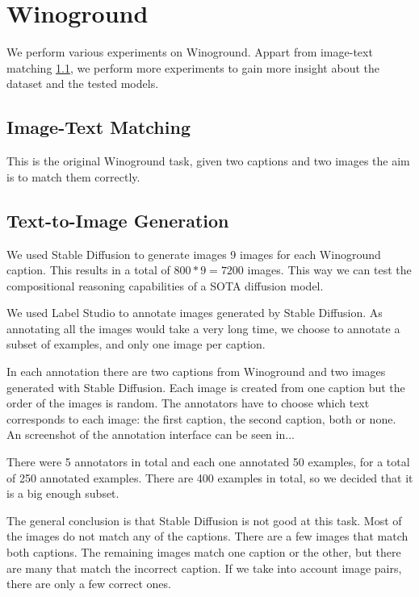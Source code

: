 \section{Winoground}

We perform various experiments on Winoground. Appart from image-text matching \ref{image_text_matching}, we perform more experiments to gain more insight about the dataset and the tested models.

\subsection{Image-Text Matching} \label{image_text_matching}

This is the original Winoground task, given two captions and two images the aim is to match them correctly.

\subsection{Text-to-Image Generation} \label{text_to_image_generation}

We used Stable Diffusion to generate images 9 images for each Winoground caption. This results in a total of $800*9=7200$ images. This way we can test the compositional reasoning capabilities of a SOTA diffusion model.

We used Label Studio to annotate images generated by Stable Diffusion. As annotating all the images would take a very long time, we choose to annotate a subset of examples, and only one image per caption.

In each annotation there are two captions from Winoground and two images generated with Stable Diffusion. Each image is created from one caption but the order of the images is random. The annotators have to choose which text corresponds to each image: the first caption, the second caption, both or none. An screenshot of the annotation interface can be seen in...

There were 5 annotators in total and each one annotated 50 examples, for a total of 250 annotated examples. There are 400 examples in total, so we decided that it is a big enough subset.

The general conclusion is that Stable Diffusion is not good at this task. Most of the images do not match any of the captions. There are a few images that match both captions. The remaining images match one caption or the other, but there are many that match the incorrect caption. If we take into account image pairs, there are only a few correct ones.

